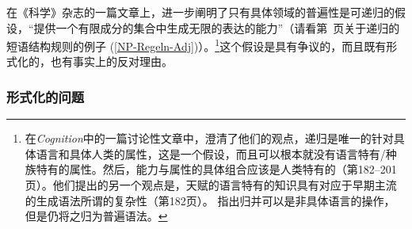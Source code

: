 在《科学》杂志的一篇文章上，\citet*{HCF2002a}进一步阐明了只有具体领域的普遍性是可递归的假设，“提供一个有限成分的集合中生成无限的表达的能力”（请看第~\pageref{NP-Regeln-Adj}页关于递归的短语结构规则的例子 (\ref{NP-Regeln-Adj})）。\footnote{
在\emph{Cognition}中的一篇讨论性文章中，\citet*{FHC2005a}澄清了他们的观点，递归是唯一的针对具体语言和具体人类的属性，这是一个假设，而且可以根本就没有语言特有/种族特有的属性。然后，能力与属性的具体组合应该是人类特有的（第182--201页）。他们提出的另一个观点是，天赋的语言特有的知识具有对应于早期主流的生成语法所谓的复杂性（第182页）。
\citet[]{Chomsky2007a} 指出归并可以是非具体语言的操作，但是仍将之归为普遍语法。
}这个假设是具有争议的，而且既有形式化的，也有事实上的反对理由。
%

\subsubsection{形式化的问题}

